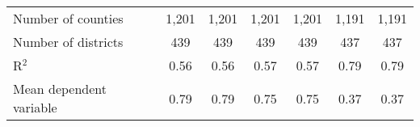 {\begin{tabular}{l*{6}{c}}
Number of counties  &       1,201         &       1,201         &       1,201         &       1,201         &       1,191         &       1,191         \\
Number of districts &         439         &         439         &         439         &         439         &         437         &         437         \\
R$^2$               &        0.56         &        0.56         &        0.57         &        0.57         &        0.79         &        0.79         \\
Mean dependent variable&        0.79         &        0.79         &        0.75         &        0.75         &        0.37         &        0.37         \\
\bottomrule
\end{tabular}
}
